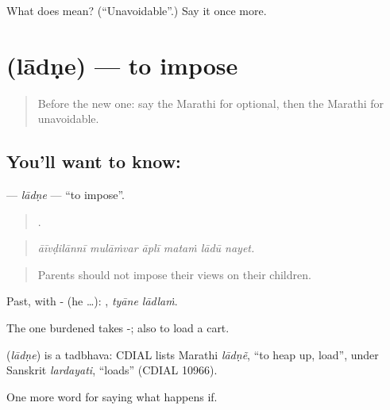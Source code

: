\begin{tcolorbox}[breakable,colback=teal!4,colframe=teal!35!black,title={Before you move on}]
What does  mean? (\textquotedblleft{}Unavoidable\textquotedblright{}.) Say it once more.
\end{tcolorbox}
\section[\texorpdfstring{\mr{लादणे} (lādṇe)}{लादणे (lādṇe)}]{ (lādṇe) — to impose}

\label{lesson:MR-C380-ladne}



\begin{quote}
Before the new one: say the Marathi for optional, then the Marathi for unavoidable.
\end{quote}

\subsection*{You'll want to know: }
\textbf{} — \emph{lādṇe} — \textquotedblleft{}to impose\textquotedblright{}.

\begin{quote}
     .
\end{quote}

\begin{quote}
\emph{āīvḍilānnī mulāṁvar āplī mataṁ lādū nayet.}
\end{quote}

\begin{quote}
Parents should not impose their views on their children.
\end{quote}

Past, with - (he …):  , \emph{tyāne lādlaṁ}.

The one burdened takes -; also to load a cart.

\begin{cousinweb}
\textbf{} (\emph{lādṇe}) is a tadbhava: CDIAL lists Marathi \emph{lādṇẽ}, \textquotedblleft{}to heap up, load\textquotedblright{}, under Sanskrit \emph{lardayati}, \textquotedblleft{}loads\textquotedblright{} (CDIAL 10966).
\end{cousinweb}

\begin{grammarlens}[title={What you've built}]
One more word for saying what happens if.
\end{grammarlens}

